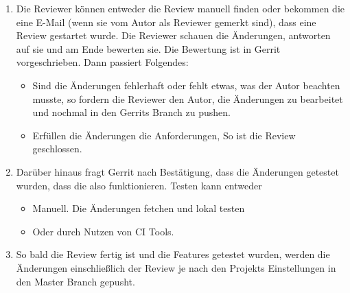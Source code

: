 \begin{itemize}
\begin{enumerate}
			\item Die Reviewer können entweder die Review manuell finden oder bekommen die eine E-Mail (wenn sie vom Autor als Reviewer gemerkt sind), dass eine Review
				 gestartet wurde. Die Reviewer schauen die Änderungen, antworten auf sie und am Ende bewerten sie. Die Bewertung ist in Gerrit vorgeschrieben.
				 Dann passiert Folgendes:
				 \begin{itemize}
				 	\item Sind die Änderungen fehlerhaft oder fehlt etwas, was der Autor beachten musste, so fordern die Reviewer den Autor, die Änderungen zu bearbeitet
				 		und nochmal in den Gerrits Branch zu pushen.
				 	\item Erfüllen die Änderungen die Anforderungen, So ist die Review geschlossen.
				 \end{itemize}
			\item Darüber hinaus fragt Gerrit nach Bestätigung, dass die Änderungen getestet wurden, dass die also funktionieren. Testen kann entweder 
			\begin{itemize}
				\item Manuell. Die Änderungen fetchen und lokal testen
				\item Oder durch Nutzen von \ac{CI} Tools.
			\end{itemize}
			\item So bald die Review fertig ist und die Features getestet wurden, werden die Änderungen einschließlich der Review je nach den Projekts Einstellungen in
				den Master Branch gepusht.
		\end{enumerate}
		
\end{itemize}

